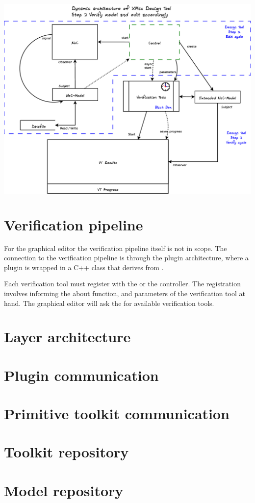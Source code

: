 \begin{center}
	\includegraphics[width=.9\linewidth]{../architecture-dynamic}
	\label{fig:dynamic-arch}
\end{center}

\section{Verification pipeline}

For the graphical editor the verification pipeline itself is
not in scope. The connection to the verification pipeline is through
the plugin architecture, where a plugin is wrapped in a C++ class
that derives from .

Each verification tool must register with the  or 
the controller. The registration involves informing the
 about function, and parameters of the 
verification tool at hand. The graphical editor will ask the 
 for available verification tools.


\section{Layer architecture}

\section{Plugin communication}

\section{Primitive toolkit communication}

\section{Toolkit repository}

\section{Model repository}
